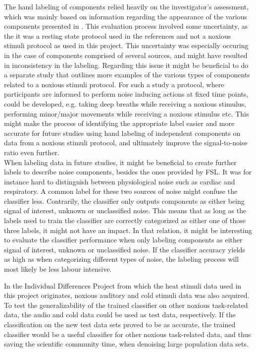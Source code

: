 The hand labeling of components relied heavily on the investigator’s assessment, which was mainly based on information regarding the appearance of the various components presented in \cite{Salimi-Khorshidi2014, Griffanti2017}. This evaluation process involved some uncertainty, as the it was a resting state protocol used in the references and not a noxious stimuli protocol as used in this project. This uncertainty was especially occuring in the case of components comprised of several sources, and might have resulted in inconsistency in the labeling. Regarding this issue it might be beneficial to do a separate study that outlines more examples of the various types of components related to a noxious stimuli protocol. For such a study a protocol, where participants are informed to perform noise inducing actions at fixed time points, could be developed, e.g. taking deep breaths while receiving a noxious stimulus, performing minor/major movements while receiving a noxious stimulus etc. This might make the process of identifying the appropriate label easier and more accurate for future studies using hand labeling of independent components on data from a noxious stimuli protocol, and ultimately improve the signal-to-noise ratio even further. \\
When labeling data in future studies, it might be beneficial to create further labels to describe noise components, besides the ones provided by FSL. It was for instance hard to distinguish between physiological noise such as cardiac and respiratory. A common label for these two sources of noise might confuse the classifier less. Contrarily, the classifier only outputs components as either being signal of interest, unknown or unclassified noise. This means that as long as the labels used to train the classifier are correctly categorized as either one of those three labels, it might not have an impact. In that relation, it might be interesting to evaluate the classifier performance when only labeling components as either signal of interest, unknown or unclassified noise. If the classifier accuracy yields as high as when categorizing different types of noise, the labeling process will most likely be less labour intensive.

In the Individual Differences Project from which the heat stimuli data used in this project originates, noxious auditory and cold stimuli data was also acquired. To test the generalizability of the trained classifier on other noxious task-related data, the audio and cold data could be used as test data, respectively. If the classification on the new test data sets proved to be as accurate, the trained classifier would be a useful classifier for other noxious task-related data, and thus saving the scientific community time, when denoising large population data sets. \\

